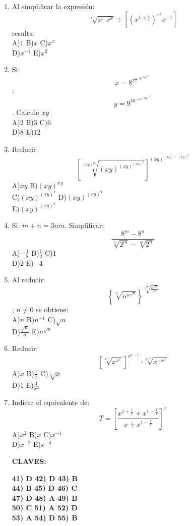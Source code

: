 \documentclass[
  10pt,
]{article}
\begin{document}
\begin{enumerate}
\item
  Al simplificar la expresión:\\
  \[\sqrt[x^{- 1}]{x \cdot x^{x}} \div \left\lbrack \left( x^{1 + \frac{1}{x}} \right)^{x^{2}}x^{- 1} \right\rbrack
  \] resulta:\\
  A)\(1\) B)\(x\) C)\(x^{x}\)\\
  D)\(x^{- 1}\) E)\(x^{2}\)
\item
  Si:\\
  \[x = 8^{27^{- 9^{- 64^{- 6^{- 1}}}}}
  \];\\
  \[y = 9^{16^{- 16^{- 512^{- 3^{- 2}}}}}
  \]. Calcule \(xy\)\\
  A)\(2\) B)\(3\) C)\(6\)\\
  D)\(8\) E)\(12\)
\item
  Reducir:\\
  \[\left\lbrack \sqrt[(xy)^{xy}]{(xy)^{(xy)^{(xy)^{3}}}} \right\rbrack^{(xy)^{(xy) - (xy)^{3}}}
  \]A)\(xy\) B)\((xy)^{xy}\)\\
  C)\((xy)^{(xy)^{2}}\) D)\((xy)^{(xy)^{3}}\)\\
  E)\((xy)^{(xy)^{4}}\)
\item
  Si: \(m + n = 3mn\). Simplificar:\\
  \[\frac{8^{m} - 8^{n}}{\sqrt[n]{2^{m}} - \sqrt[m]{2^{n}}}
  \]A)\(- \frac{1}{8}\) B)\(\frac{1}{2}\) C)\(1\)\\
  D)\(2\) E)\(- 4\)
\item
  Al reducir:\\
  \[\left\{ \sqrt[n]{n^{n^{\sqrt{n}}}} \right\}^{\sqrt[\sqrt{n}]{\frac{n^{\sqrt{n}}}{n^{n}}}}
  \]; \(n \neq 0\) se obtiene:\\
  A)\(n\) B)\(n^{- 1}\) C)\(\sqrt{n}\)\\
  D)\(\frac{\sqrt{n}}{n}\) E)\(n^{\sqrt{n}}\)
\item
  Reducir:\\
  \[\left\lbrack \sqrt[x^{- 1}]{x^{x^{x}}} \right\rbrack^{x^{x - 1}} \cdot \sqrt[x^{- x}]{x^{- x^{x}}}
  \]A)\(x\) B)\(\frac{1}{x}\) C)\(\sqrt[x]{x}\)\\
  D)\(1\) E)\(\frac{1}{x^{2}}\)
\item
  Indicar el equivalente de:\\
  \[T = \left\lbrack \frac{x^{1 + \frac{1}{x}} + x^{1 - \frac{1}{x}}}{x + x^{1 - \frac{2}{x}}} \right\rbrack^{x}
  \]A)\(x^{2}\) B)\(x\) C)\(x^{- 1}\)\\
  D)\(x^{- 2}\) E)\(x^{- 3}\)

  \textbf{CLAVES:}

  \textbf{41) D 42) D 43) B\\
  44) B 45) D 46) C\\
  47) D 48) A 49) B\\
  50) C 51) A 52) D\\
  53) A 54) D 55) B}
\end{enumerate}
\end{document}
